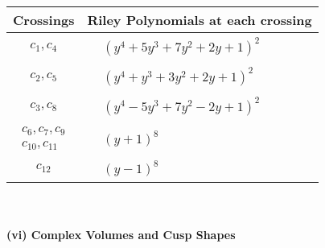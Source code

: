 \documentclass[1p]{elsarticle_modified}
\theoremstyle{definition}
\begin{document}
\begin{tabular}{m{50pt}|m{274pt}}
Crossings & \hspace{64pt}Riley Polynomials at each crossing \\
\hline $$\begin{aligned}c_{1},c_{4}\end{aligned}$$&$\begin{aligned}
&(y^4+5 y^3+7 y^2+2 y+1)^2
\end{aligned}$\\
\hline $$\begin{aligned}c_{2},c_{5}\end{aligned}$$&$\begin{aligned}
&(y^4+y^3+3 y^2+2 y+1)^2
\end{aligned}$\\
\hline $$\begin{aligned}c_{3},c_{8}\end{aligned}$$&$\begin{aligned}
&(y^4-5 y^3+7 y^2-2 y+1)^2
\end{aligned}$\\
\hline $$\begin{aligned}c_{6},c_{7},c_{9}\\c_{10},c_{11}\end{aligned}$$&$\begin{aligned}
&(y+1)^8
\end{aligned}$\\
\hline $$\begin{aligned}c_{12}\end{aligned}$$&$\begin{aligned}
&(y-1)^8
\end{aligned}$\\
\hline
\end{tabular}\\~\\
\newpage\flushleft \textbf{(vi) Complex Volumes and Cusp Shapes}
\end{document}
